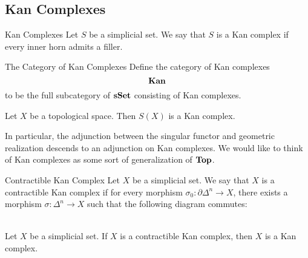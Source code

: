 \documentclass[a4paper]{article}
\begin{document}
\subsection{Kan Complexes}
\begin{defn}{Kan Complexes}{} Let $S$ be a simplicial set. We say that $S$ is a Kan complex if every inner horn admits a filler. 
\end{defn}

\begin{defn}{The Category of Kan Complexes}{} Define the category of Kan complexes $$\bold{Kan}$$ to be the full subcategory of $\bold{sSet}$ consisting of Kan complexes. 
\end{defn}

\begin{lmm}{}{} Let $X$ be a topological space. Then $S(X)$ is a Kan complex. 
\end{lmm}

In particular, the adjunction between the singular functor and geometric realization descends to an adjunction on Kan complexes. We would like to think of Kan complexes as some sort of generalization of $\bold{Top}$. 

\begin{defn}{Contractible Kan Complex}{} Let $X$ be a simplicial set. We say that $X$ is a contractible Kan complex if for every morphism $\sigma_0:\partial\Delta^n\to X$, there exists a morphism $\sigma:\Delta^n\to X$ such that the following diagram commutes: \\~\\
\end{defn}

\begin{lmm}{}{} Let $X$ be a simplicial set. If $X$ is a contractible Kan complex, then $X$ is a Kan complex. 
\end{lmm}
\end{document}
